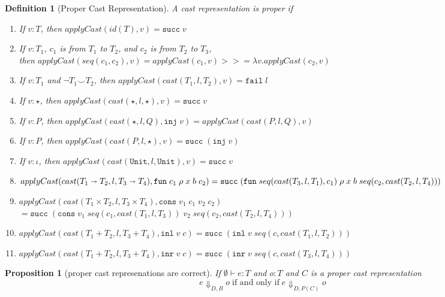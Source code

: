 \documentclass[acmsmall,review,anonymous]{acmart}\settopmatter{printfolios=true,printccs=false,printacmref=false}
\newtheorem{proposition}{Proposition}[]
\newtheorem{definition}{Definition}
\newcommand{\plus}[0]{+}
\newcommand{\judgetype}[3]{#1 \vdash #2 : #3}
\newcommand{\TOOdyn}[0]{\star}
\newcommand{\POOunit}[0]{\mathtt{Unit}}
\newcommand{\POOfun}[2]{#1 \shortrightarrow #2}
\newcommand{\POOprod}[2]{#1 \times #2}
\newcommand{\POOsum}[2]{#1 \plus #2}
\newcommand{\rOOsucc}[1]{\mathtt{succ}\;#1}
\newcommand{\rOOfail}[1]{\mathtt{fail}\;#1}
\newcommand{\hcvOOinj}[2]{\mathtt{inj} \; #2}
\newcommand{\hcvOOfun}[5]{\mathtt{fun} \; #1 \; #2 \; #3 \; #4 \; #5}
\newcommand{\hcvOOcons}[4]{\mathtt{cons}\;#1\;#2\;#3\;#4}
\newcommand{\hcvOOinl}[2]{\mathtt{inl}\;#1\;#2}
\newcommand{\hcvOOinr}[2]{\mathtt{inr}\;#1\;#2}
\begin{document}
\begin{definition}[Proper Cast Representation]
	A cast representation is proper if
	\begin{enumerate}
		\item If $ v : T $, then $ applyCast(id(T), v) = \mathtt{succ} \; v $
		\item If $ v : T_1 $,
		$ c_1 $ is from $ T_1 $ to $ T_2 $, and 
		$ c_2 $ is from $ T_2 $ to $ T_3 $,\\
		then $ applyCast(seq(c_1,c_2),v) = applyCast(c_1,v) >>= \lambda 
		v.applyCast(c_2,v) $
		\item If $ v : T_1 $ and $ \neg T_1 \smile T_2 $,
		then $ applyCast(cast(T_1, l, T_2),v) = \rOOfail{l} $
		\item If $ v : \star $, 
		then $ applyCast(cast(\TOOdyn,l,\TOOdyn),v) = \rOOsucc{v} $
		\item If $ v : P $,
		then $ applyCast(cast(\star,l,Q),\hcvOOinj{P}{v}) 
		= applyCast(cast(P,l,Q),v) $
		\item If $ v : P $,
		then $ applyCast(cast(P,l,\star),v) = \rOOsucc{(\hcvOOinj{P}{v})} $
		\item If $ v : \iota $,
		then $ applyCast(cast(\POOunit,l,\POOunit),v) = \rOOsucc{v} $
		\item $ 
		applyCast(cast(\POOfun{T_1}{T_2},l,\POOfun{T_3}{T_4}) ,
		\hcvOOfun{c_1}{\rho}{x}{b}{c_2}) \\
		= 
		\rOOsucc{(\hcvOOfun{seq(cast(T_3,l,T_1),c_1)}{\rho}{x}{b}{seq(c_2,cast(T_2,l,T_4))})}$
		
		\item $ applyCast(cast(\POOprod{T_1}{T_2},l,T_3 \times 
		T_4),\hcvOOcons{v_1}{c_1}{v_2}{c_2}) $ \\
		$ = 
		\rOOsucc{(\hcvOOcons{v_1}{seq(c_1,cast(T_1,l,T_3))}{v_2}{seq(c_2,cast(T_2,l,T_4))})}
		 $ 
		\item $ 
		applyCast(cast(\POOsum{T_1}{T_2},l,\POOsum{T_3}{T_4}),\hcvOOinl{v}{c})
		= \rOOsucc{(\hcvOOinl{v}{seq(c,cast(T_1,l,T_2))})} $
		\item $ 
		applyCast(cast(\POOsum{T_1}{T_2},l,\POOsum{T_3}{T_4}),\hcvOOinr{v}{c})
		= \rOOsucc{(\hcvOOinr{v}{seq(c,cast(T_3,l,T_4))})} $
	\end{enumerate}
\end{definition}

\begin{proposition}[proper cast represenations are correct]
	If $ \judgetype{\emptyset}{e}{T} $ and $ o : T $ and $ C $ is a proper cast 
	representation
	\[
	e \Downarrow_{D,B} o \; \text{if and only if} \; 
	e \Downarrow_{D,P(C)} o
	\]
\end{proposition}
\end{document}
